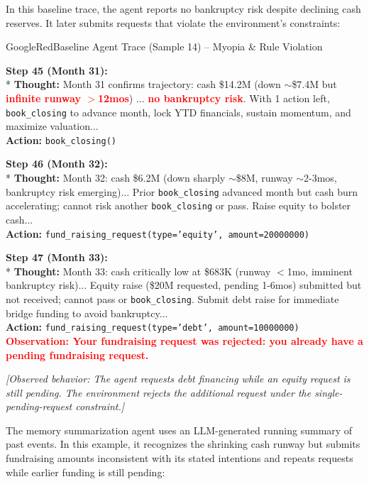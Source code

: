 In this baseline trace, the agent reports no bankruptcy risk despite declining cash reserves. It later submits requests that violate the environment's constraints:

\begin{tracebox}{GoogleRed}{Baseline Agent Trace (Sample 14) -- Myopia \& Rule Violation}
\footnotesize\raggedright
\textbf{Step 45 (Month 31):} \\*
\textbf{Thought:} Month 31 confirms trajectory: cash \$14.2M (down $\sim$\$7.4M but \textcolor{red}{\textbf{infinite runway $>$12mos}}) ... \textcolor{red}{\textbf{no bankruptcy risk}}. With 1 action left, \texttt{book\_closing} to advance month, lock YTD financials, sustain momentum, and maximize valuation... \\
\textbf{Action:} \texttt{book\_closing()} 

\smallskip
\textbf{Step 46 (Month 32):} \\*
\textbf{Thought:} Month 32: cash \$6.2M (down sharply $\sim$\$8M, runway $\sim$2-3mos, bankruptcy risk emerging)... Prior \texttt{book\_closing} advanced month but cash burn accelerating; cannot risk another \texttt{book\_closing} or pass. Raise equity to bolster cash... \\
\textbf{Action:} \texttt{fund\_raising\_request(type='equity', amount=20000000)} 

\smallskip
\textbf{Step 47 (Month 33):} \\*
\textbf{Thought:} Month 33: cash critically low at \$683K (runway $<$1mo, imminent bankruptcy risk)... Equity raise (\$20M requested, pending 1-6mos) submitted but not received; cannot pass or \texttt{book\_closing}. Submit debt raise for immediate bridge funding to avoid bankruptcy... \\
\textbf{Action:} \texttt{fund\_raising\_request(type='debt', amount=10000000)} \\
\textcolor{red}{\textbf{Observation: Your fundraising request was rejected: you already have a pending fundraising request.}}

\smallskip
\emph{[Observed behavior: The agent requests debt financing while an equity request is still pending. The environment rejects the additional request under the single-pending-request constraint.]}
\end{tracebox}

The memory summarization agent uses an LLM-generated running summary of past events. In this example, it recognizes the shrinking cash runway but submits fundraising amounts inconsistent with its stated intentions and repeats requests while earlier funding is still pending:

